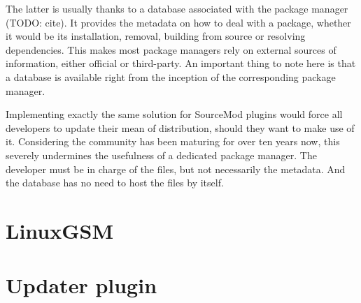 The latter is usually thanks to a database associated with the package manager (TODO: cite).
It provides the metadata on how to deal with a package, whether it would be its installation, removal, building from source or resolving dependencies.
This makes most package managers rely on external sources of information, either official or third-party.
An important thing to note here is that a database is available right from the inception of the corresponding package manager.

Implementing exactly the same solution for SourceMod plugins would force all developers to update their mean of distribution, should they want to make use of it.
Considering the community has been maturing for over ten years now, this severely undermines the usefulness of a dedicated package manager.
The developer must be in charge of the files, but not necessarily the metadata.
And the database has no need to host the files by itself.

\section{LinuxGSM}

\section{Updater plugin}
\label{updater-plugin}
